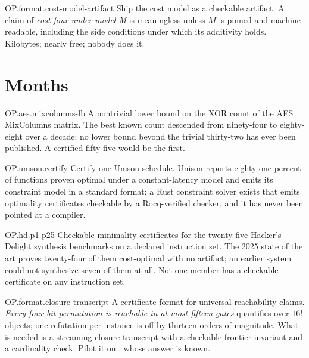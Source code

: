 \begin{artifact}{OP.format.cost-model-artifact}
Ship the cost model as a checkable artifact. A claim of \emph{cost four under model M} is meaningless unless \(M\) is pinned and machine-readable, including the side conditions under which its additivity holds. Kilobytes; nearly free; nobody does it.
\end{artifact}

\section{Months}

\begin{artifact}{OP.aes.mixcolumns-lb}
A nontrivial lower bound on the XOR count of the AES MixColumns matrix. The best known count descended from ninety-four to eighty-eight over a decade; no lower bound beyond the trivial thirty-two has ever been published. A certified fifty-five would be the first.
\end{artifact}

\begin{artifact}{OP.unison.certify}
Certify one Unison schedule. Unison reports eighty-one percent of functions proven optimal under a constant-latency model and emits its constraint model in a standard format; a Rust constraint solver exists that emits optimality certificates checkable by a Rocq-verified checker, and it has never been pointed at a compiler.
\end{artifact}

\begin{artifact}{OP.hd.p1-p25}
Checkable minimality certificates for the twenty-five Hacker's Delight synthesis benchmarks on a declared instruction set. The 2025 state of the art proves twenty-four of them cost-optimal with no artifact; an earlier system could not synthesize seven of them at all. Not one member has a checkable certificate on any instruction set.
\end{artifact}

\begin{artifact}{OP.format.closure-transcript}
A certificate format for universal reachability claims. \emph{Every four-bit permutation is reachable in at most fifteen gates} quantifies over \(16!\) objects; one refutation per instance is off by thirteen orders of magnitude. What is needed is a streaming closure transcript with a checkable frontier invariant and a cardinality check. Pilot it on , whose answer is known.
\end{artifact}

